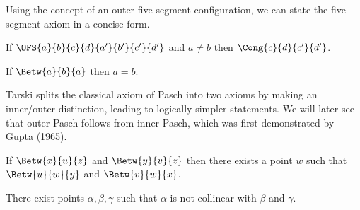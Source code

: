 \documentclass[10pt,a4paper,parskip=half,numbers=endperiod,parskip]{scrartcl}
\begin{document}
  Using the concept of an outer five segment configuration,
  we can state the five segment axiom in a concise form.


  \begin{forthel}
    \begin{axiom} %
      If $\OFS{a}{b}{c}{d}{a'}{b'}{c'}{d'}$ and
      $a \neq b$ then $\Cong{c}{d}{c'}{d'}$.
    \end{axiom}
  \end{forthel}


  \begin{forthel} %
    \begin{axiom}
      If $\Betw{a}{b}{a}$ then $a = b$.
    \end{axiom}
  \end{forthel}


  Tarski splits the classical axiom of Pasch into two axioms by making an inner/outer distinction,
  leading to logically simpler statements.
  We will later see that outer Pasch follows from inner Pasch,
  which was first demonstrated by Gupta (1965).



  \begin{forthel}
    \begin{axiom} %
      If $\Betw{x}{u}{z}$ and $\Betw{y}{v}{z}$ then there exists a point $w$
      such that $\Betw{u}{w}{y}$ and $\Betw{v}{w}{x}$.
    \end{axiom}
  \end{forthel}


  \begin{forthel}
    \begin{axiom} %
      There exist points
      $\alpha, \beta, \gamma$ such that
      $\alpha$ is not collinear with $\beta$ and $\gamma$.
    \end{axiom}
  \end{forthel}
\end{document}
